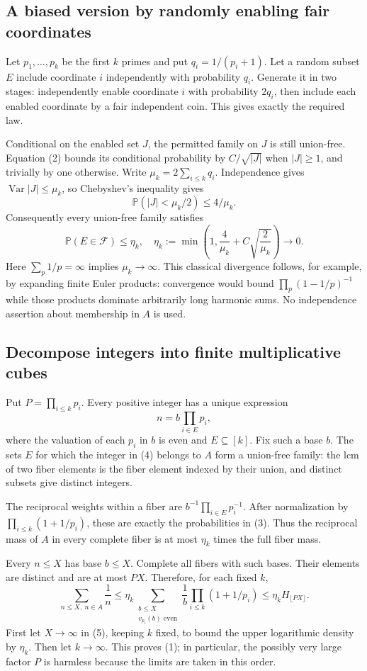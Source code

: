 \subsection*{A biased version by randomly enabling fair coordinates}
Let $p_1,\ldots,p_k$ be the first $k$ primes and put $q_i=1/(p_i+1)$. Let a random subset $E$ include coordinate $i$ independently with probability $q_i$. Generate it in two stages: independently enable coordinate $i$ with probability $2q_i$, then include each enabled coordinate by a fair independent coin. This gives exactly the required law.

Conditional on the enabled set $J$, the permitted family on $J$ is still union-free. Equation (2) bounds its conditional probability by $C/\sqrt{|J|}$ when $|J|\ge1$, and trivially by one otherwise. Write $\mu_k=2\sum_{i\le k}q_i$. Independence gives $\operatorname{Var}|J|\le\mu_k$, so Chebyshev's inequality gives
\[\mathbb P(|J|<\mu_k/2)\le4/\mu_k.
\]
Consequently every union-free family satisfies
\[\mathbb P(E\in\mathcal F)\le\eta_k,
\quad \eta_k:=\min\left(1,\frac4{\mu_k}+C\sqrt{\frac2{\mu_k}}\right)\longrightarrow0.\tag{3}\]
Here $\sum_p1/p=\infty$ implies $\mu_k\to\infty$. This classical divergence follows, for example, by expanding finite Euler products: convergence would bound $\prod_p(1-1/p)^{-1}$ while those products dominate arbitrarily long harmonic sums. No independence assertion about membership in $A$ is used.

\subsection*{Decompose integers into finite multiplicative cubes}
Put $P=\prod_{i\le k}p_i$. Every positive integer has a unique expression
\[n=b\prod_{i\in E}p_i,\tag{4}\]
where the valuation of each $p_i$ in $b$ is even and $E\subseteq[k]$. Fix such a base $b$. The sets $E$ for which the integer in (4) belongs to $A$ form a union-free family: the lcm of two fiber elements is the fiber element indexed by their union, and distinct subsets give distinct integers.

The reciprocal weights within a fiber are $b^{-1}\prod_{i\in E}p_i^{-1}$. After normalization by $\prod_{i\le k}(1+1/p_i)$, these are exactly the probabilities in (3). Thus the reciprocal mass of $A$ in every complete fiber is at most $\eta_k$ times the full fiber mass.

Every $n\le X$ has base $b\le X$. Complete all fibers with such bases. Their elements are distinct and are at most $PX$. Therefore, for each fixed $k$,
\[\sum_{n\le X,\ n\in A}\frac1n
\le\eta_k\sum_{\substack{b\le X\\v_{p_i}(b)\text{ even}}}\frac1b\prod_{i\le k}(1+1/p_i)
\le\eta_k H_{\lfloor PX\rfloor}.\tag{5}\]
First let $X\to\infty$ in (5), keeping $k$ fixed, to bound the upper logarithmic density by $\eta_k$. Then let $k\to\infty$. This proves (1); in particular, the possibly very large factor $P$ is harmless because the limits are taken in this order.

